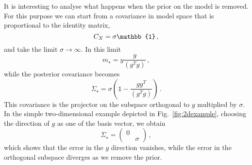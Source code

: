 It is interesting to analyse what happens when the prior on the model is
removed. For this purpose we can start from a covariance in model space that is
proportional to the identity matrix, 
\begin{equation}
  \label{eq:DiagCovSigma}
  \modelpriorcov = \sigma \mathbb{1}\, ,
\end{equation}
and take the limit $\sigma \to \infty$. In this limit
\begin{equation}
  \label{eq:LargeSigmaLimit}
  m_\star = y \frac{g}{(g^T g)}\, ,
\end{equation}
while the posterior covariance becomes
\begin{equation}
  \label{eq:ExplcitCov}
  \Sigma_\star= \sigma \left(
    \mathbb{1} - \frac{g g^T}{(g^T g)}
  \right)\, .
\end{equation}
This covariance is the projector on the subspace orthogonal to $g$ multiplied by
$\sigma$. In the simple two-dimensional example depicted in
Fig.~\ref{fig:2dexample}, choosing the direction of $g$ as one of the basis
vector, we obtain
\begin{equation}
  \label{eq:ExplCovTwo}
  \Sigma_\star = 
  \begin{pmatrix}
    0 & \\
    & \sigma
  \end{pmatrix}\, ,
\end{equation}
which shows that the error in the $g$ direction vanishes, while the error in the
orthogonal subspace diverges as we remove the prior. 

